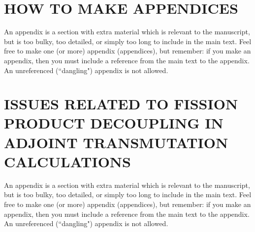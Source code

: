 \documentclass[12pt]{article}
\begin{document}
\makeatletter
\def\@seccntformat#1{APPENDIX \csname the#1\endcsname.~}
\makeatother

\section{HOW TO MAKE APPENDICES}
\label{app::a}

An appendix is a section with extra material which is relevant to the manuscript, but is too bulky, too detailed, or simply too long to include in the main text. Feel free to make one (or more) appendix (appendices), but remember: if you make an appendix, then you must include a reference from the main text to the appendix. An unreferenced (``dangling") appendix is not allowed.

\section{ISSUES RELATED TO FISSION PRODUCT DECOUPLING IN ADJOINT TRANSMUTATION CALCULATIONS}
\label{app::b}

An appendix is a section with extra material which is relevant to the manuscript, but is too bulky, too detailed, or simply too long to include in the main text. Feel free to make one (or more) appendix (appendices), but remember: if you make an appendix, then you must include a reference from the main text to the appendix. An unreferenced (``dangling") appendix is not allowed.
\end{document}
